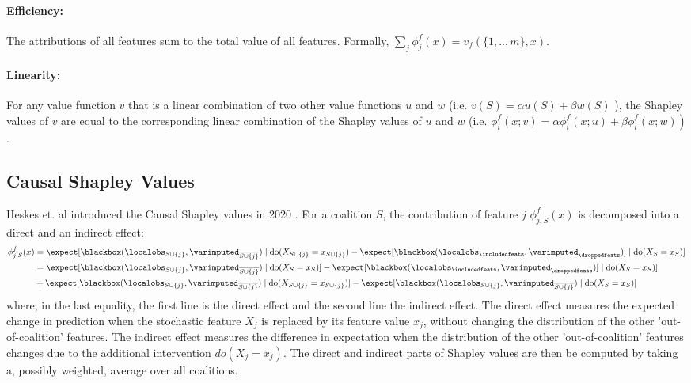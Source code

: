 \documentclass{article}
\theoremstyle{plain}
\theoremstyle{definition}
\theoremstyle{remark}
\theoremstyle{mystyle}
\newcommand{\coalitionshapley}[4]{\phi^{#1}_{#3,#2}(#4)}
\begin{document}
\paragraph{Efficiency:} {The attributions of all features sum to the total value of all features. Formally, $\sum_{j} \phi^f_{j}(x)=v_f(\{1, . ., m\},x)$.}
\paragraph{Linearity:} {For any value function $v$ that is a linear combination of two other value functions $u$ and $w$ (i.e. $v(S)=\alpha u(S)+\beta w(S)$ ), the Shapley values of $v$ are equal to the corresponding linear combination of the Shapley values of $u$ and $w$ (i.e. $\left.\phi_{i}^f(x;v)=\alpha \phi_{i}^f(x;u)+\beta \phi_{i}^f(x;w)\right)$.}


\subsection{Causal Shapley Values} \label{subsec:causal_shap}

Heskes et. al introduced the Causal Shapley values in 2020 . For a coalition $S$, the contribution of feature $j$ $\coalitionshapley{f}{S}{j}{x}$  is decomposed into a direct and an indirect effect:
\begin{align*}
\coalitionshapley{f}{S}{j}{x}
    &=  \expect[\blackbox({\localobs_{S \cup \{j\}}, \varimputed_{\overline{S \cup \{j\}}}}) \mid \text{do}(X_{S \cup \{j\}}=x_{S \cup \{j\}}) - \expect[\blackbox({\localobs_{\includedfeats}, \varimputed_{\droppedfeats}})]\mid \text{do}(X_{S}=x_{S})] \\
    &=  \expect[\blackbox({\localobs_{S \cup \{j\}}, \varimputed_{\overline{S \cup \{j\}}}}) \mid \text{do}(X_{S}=x_{S})] - \expect[\blackbox({\localobs_{\includedfeats}, \varimputed_{\droppedfeats}})]\mid \text{do}(X_{S}=x_{S})] \\
&+   \expect[\blackbox({\localobs_{S \cup \{j\}}, \varimputed_{\overline{S \cup \{j\}}}}) \mid \text{do}(X_{S \cup \{j\}}=x_{S \cup \{j\}})] - \expect[\blackbox({\localobs_{S \cup \{j\}}, \varimputed_{\overline{S \cup \{j\}}}}) \mid \text{do}(X_{S}=x_{S})]  
\end{align*}
where, in the last equality, the first line is the direct effect and the second line the indirect effect. The direct effect measures the expected change in prediction when the stochastic feature $X_{j}$ is replaced by its feature value $x_{j}$, without changing the distribution of the other 'out-of-coalition' features. The indirect effect measures the difference in expectation when the distribution of the other 'out-of-coalition' features changes due to the additional intervention $d o\left(X_{j}=x_{j}\right)$. The direct and indirect parts of Shapley values are then be computed by taking a, possibly weighted, average over all coalitions. 
\end{document}

